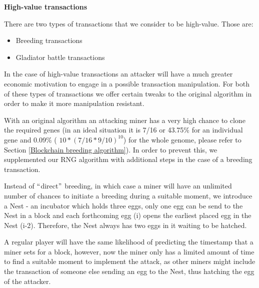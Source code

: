 \documentclass[12pt]{article}
\begin{document}
\textbf{High-value transactions}\par

There are two types of transactions that we consider to be high-value. Those are:\par

\begin{itemize}
	\item Breeding transactions\par

	\item Gladiator battle transactions
\end{itemize}\par

\begin{justify}
In the case of high-value transactions an attacker will have a much greater economic motivation to engage in a possible transaction manipulation. For both of these types of transactions we offer certain tweaks to the original algorithm in order to make it more manipulation resistant.
\end{justify}\par

\begin{justify}
With an original algorithm an attacking miner has a very high chance to clone the required genes (in an ideal situation it is 7/16 or 43.75$\%$  for an individual gene and 0.09$\%$  ( $10*(7/16*9/10)^{10}$) for the whole genome, please refer to Section  \ref{Blockchain breeding algorithm}). In order to prevent this, we supplemented our RNG algorithm with additional steps in the case of a breeding transaction.
\end{justify}\par

\begin{justify}
Instead of $``$direct$"$  breeding, in which case a miner will have an unlimited number of chances to initiate a breeding during a suitable moment, we introduce a Nest - an incubator which holds three eggs, only one egg can be send to the Nest in a block and each forthcoming egg (i) opens the earliest placed egg in the Nest (i-2). Therefore, the Nest always has two eggs in it waiting to be hatched.
\end{justify}\par

\begin{justify}
A regular player will have the same likelihood of predicting the timestamp that a miner sets for a block, however, now the miner only has a limited amount of time to find a suitable moment to implement the attack, as other miners might include the transaction of someone else sending an egg to the Nest, thus hatching the egg of the attacker.
\end{justify}\par
\end{document}
